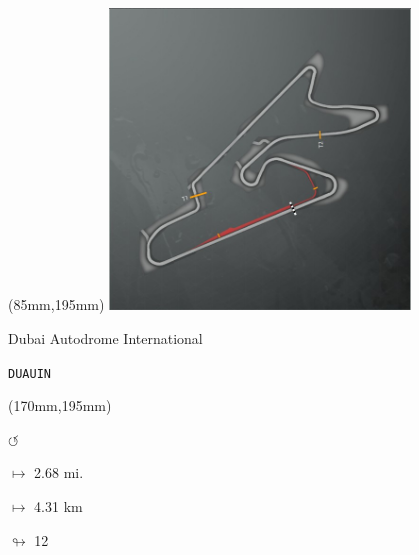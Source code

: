 \begin{textblock*}{80mm}(85mm,195mm)%
\includegraphics[width=80mm]{TR/2015-05-20_00026.png}
\centerline{Dubai Autodrome International}
\par\hfill\tiny\tt DUAUIN\\
\end{textblock*}
\begin{textblock*}{30mm}(170mm,195mm)%
\par \Huge$\circlearrowleft$
\Large
\par$\mapsto$ 2.68 mi.
\par$\mapsto$ 4.31 km
\par$\looparrowright$ 12
\end{textblock*}
\null\newpage

